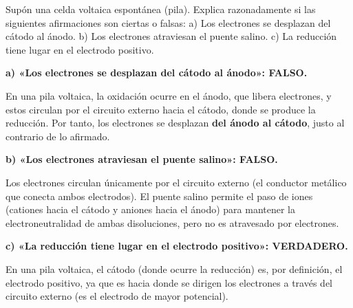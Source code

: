 \begin{exerciseEVAU}
    Supón una celda voltaica espontánea (pila). Explica razonadamente si las siguientes afirmaciones son ciertas o falsas: a) Los electrones se desplazan del cátodo al ánodo. b) Los electrones atraviesan el puente salino. c) La reducción tiene lugar en el electrodo positivo.

    \begin{solu}


        \textbf{a) «Los electrones se desplazan del cátodo al ánodo»: FALSO.}

        En una pila voltaica, la oxidación ocurre en el ánodo, que libera electrones, y estos circulan por el circuito externo hacia el cátodo, donde se produce la reducción. Por tanto, los electrones se desplazan \textbf{del ánodo al cátodo}, justo al contrario de lo afirmado.

        \textbf{b) «Los electrones atraviesan el puente salino»: FALSO.}

        Los electrones circulan únicamente por el circuito externo (el conductor metálico que conecta ambos electrodos). El puente salino permite el paso de iones (cationes hacia el cátodo y aniones hacia el ánodo) para mantener la electroneutralidad de ambas disoluciones, pero no es atravesado por electrones.

        \textbf{c) «La reducción tiene lugar en el electrodo positivo»: VERDADERO.}

        En una pila voltaica, el cátodo (donde ocurre la reducción) es, por definición, el electrodo positivo, ya que es hacia donde se dirigen los electrones a través del circuito externo (es el electrodo de mayor potencial).

    \end{solu}
\end{exerciseEVAU}

